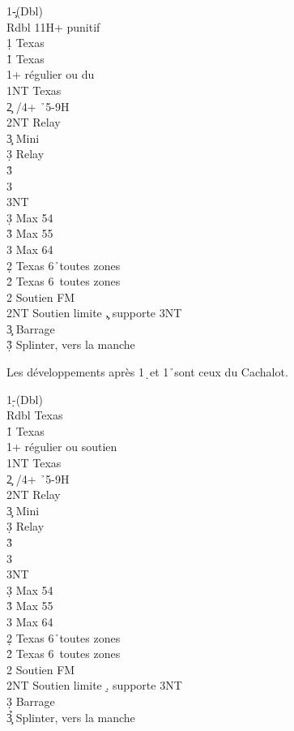 \documentclass[a4paper]{article}
\begin{document}
\begin{bidtable}
1\c-(Dbl)\\
Rdbl \> 11H+ punitif\\
1\d \> Texas \h \\
1\h \> Texas \s \\
1\s {}+ régulier ou du \d \\
1NT \> Texas \c \\
2\c {} \s /4+ \h\ 5-9H\+\\
2NT \> Relay\+\\
3\c \> Mini\+\\
3\d \> Relay\+\\
3\h {}\\
3\s {}\\
3NT \-\-\\
3\d \> Max 54\\
3\h \> Max 55\\
3\s \> Max 64\-\-\\
2\d \> Texas 6\h\ toutes zones\\
2\h \> Texas 6\s\ toutes zones\\
2\s \> Soutien FM \c \\
2NT \> Soutien limite \c , supporte 3NT\\
3\c \> Barrage \c \\
3\d\h\s \> Splinter, vers la manche
\end{bidtable}

Les développements après 1\d\ et 1\h\ sont ceux du Cachalot.

\begin{bidtable}
1\d-(Dbl)\\
Rdbl \> Texas \h \\
1\h \> Texas \s \\
1\s {}+ régulier ou soutien \d \\
1NT \> Texas \c \\
2\c {} \s /4+ \h\ 5-9H\+\\
2NT \> Relay\+\\
3\c \> Mini\+\\
3\d \> Relay\+\\
3\h {}\\
3\s {}\\
3NT \-\-\\
3\d \> Max 54\\
3\h \> Max 55\\
3\s \> Max 64\-\-\\
2\d \> Texas 6\h\ toutes zones\\
2\h \> Texas 6\s\ toutes zones\\
2\s \> Soutien FM \d \\
2NT \> Soutien limite \d , supporte 3NT\\
3\d \> Barrage \d \\
3\c\h\s \> Splinter, vers la manche
\end{bidtable}
\end{document}
